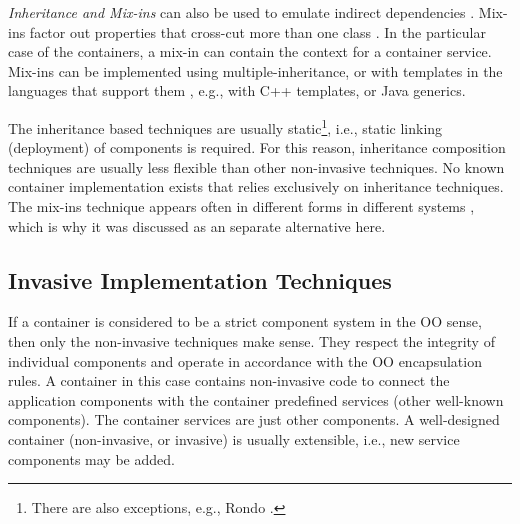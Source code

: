 \begin{dinglist}{43}
\item \textit{Inheritance and Mix-ins} can also be used to emulate indirect dependencies \cite{dip}. Mix-ins \cite{bracha90mixinbased,Ernst.99,flatt98classes,Duggan.00} factor out properties that cross-cut more than one class \cite{riel.96}. In the particular case of the containers, a mix-in can contain the context for a container service. Mix-ins can be implemented using multiple-inheritance, or with templates in the languages that support them \cite{SmaragdakisBatory.02,generative.00}, e.g., with C++ templates, or Java generics.

The inheritance based techniques are usually static\footnote{There are also exceptions, e.g., Rondo \cite{rondo.97}.}, i.e., static linking (deployment) of components is required. For this reason, inheritance composition techniques are usually less flexible than other non-invasive techniques. No known container implementation exists that relies exclusively on inheritance techniques. The mix-ins technique appears often in different forms in different systems \cite{genvoca.94}, which is why it was discussed as an separate alternative here.

\end{dinglist}

\subsection{Invasive Implementation Techniques}
\label{ch2:inv}


If a container is considered to be a strict component system in the OO sense, then only the non-invasive techniques make sense. They respect the integrity of individual components and operate in accordance with the OO encapsulation rules. A container in this case contains non-invasive code to connect the application components with the container predefined services (other well-known components). The container services are just other components. A well-designed container (non-invasive, or invasive) is usually extensible, i.e., new service components may be added.

